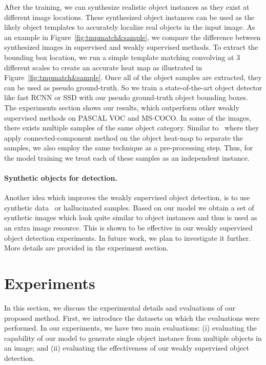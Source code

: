\documentclass[runningheads]{llncs}
\begin{document}
After the training, we can synthesize realistic object instances as they exist at different image locations. These synthesized object instances can be used as the likely object templates to accurately localize real objects in the input image. As an example in Figure~\ref{fig:tmpmatch&sample}, we compare the difference between synthesized images in supervised and weakly supervised methods. 
\noindent To extract the bounding box location, we run a simple template matching convolving at 3 different scales to create an accurate heat map as illustrated in Figure~\ref{fig:tmpmatch&sample}. Once all of the object samples are extracted, they can be used as pseudo ground-truth. So we train a state-of-the-art object detector like fast RCNN or SSD \cite{fastRCNN,SSD} with our pseudo ground-truth object bounding boxes. The experiments section shows our results, which outperform other weakly supervised methods on PASCAL VOC and MS-COCO. In some of the images, there exists multiple samples of the same object category. Similar to~\cite{gap}  where they apply connected-component method on the object heat-map to separate the samples, we also employ the same technique as a pre-processing step. Thus, for the model training we treat each of these samples as an independent instance.

\paragraph*{Synthetic objects for detection.} Another idea which improves the weakly supervised object detection, is to use synthetic data~\cite{3dSynth} or hallucinated samples. Based on our model we obtain a set of synthetic images which look quite similar to object instances and thus is used as an extra image resource. This is shown to be effective in our weakly supervised object detection experiments. In future work, we plan to investigate it further. More details are provided in the experiment section.




\section{Experiments}\label{sec:exp}

In this section, we discuss the experimental details and evaluations of our proposed method. First, we introduce the datasets on which the evaluations were performed. In our experiments, we have two main evaluations: (i) evaluating the capability of our model to generate single object instance from multiple objects in an image; and (ii) evaluating the effectiveness of our weakly supervised object detection.
\end{document}
